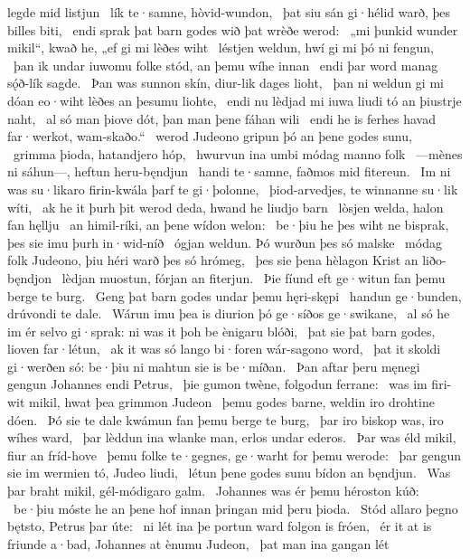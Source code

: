 legde mid listjun \hld\ lík te·samne,
hòvid-wundon, \hld\ þat siu sán gi·hélid warð,
þes billes biti, \hld\ endi sprak þat barn godes
wið þat wrèðe werod: \hld\ „mi þunkid wunder mikil“, kwað he,
„ef gi mi lèðes wiht \hld\ léstjen weldun,
hwí gi mi þó ni fengun, \hld\ þan ik undar iuwomu folke stód,
an þemu wíhe innan \hld\ endi þar word manag
sǫ́ð-lík sagde. \hld\ Þan was sunnon skín,
diur-lik dages lioht, \hld\ þan ni weldun gi mi dóan eo·wiht
lèðes an þesumu liohte, \hld\ endi nu lèdjad mi iuwa liudi tó
an þiustrje naht, \hld\ al só man þiove dót,
þan man þene fáhan wili \hld\ endi he is ferhes havad
far·werkot, wam-skaðo.“ \hld\ werod Judeono
gripun þó an þene godes sunu, \hld\ grimma þioda,
hatandjero hóp, \hld\ hwurvun ina umbi
módag manno folk \hld\ —mènes ni sáhun—,
heftun heru-bęndjun \hld\ handi te·samne,
faðmos mid fitereun. \hld\ Im ni was su·likaro firin-kwála
þarf te gi·þolonne, \hld\ þiod-arvedjes,
te winnanne su·lik wíti, \hld\ ak he it þurh þit werod deda,
hwand he liudjo barn \hld\ lòsjen welda,
halon fan hęllju \hld\ an himil-ríki,
an þene wídon welon: \hld\ be·þiu he þes wiht ne bisprak,
þes sie imu þurh in·wid-níð \hld\ ógjan weldun.
Þó wurðun þes só malske \hld\ módag folk Judeono,
þiu héri warð þes só hrómeg, \hld\ þes sie þena hèlagon Krist
an liðo-bęndjon \hld\ lèdjan muostun,
fórjan an fiterjun. \hld\ Þie fíund eft ge·witun
fan þemu berge te burg. \hld\ Geng þat barn godes
undar þemu hęri-skępi \hld\ handun ge·bunden,
drúvondi te dale. \hld\ Wárun imu þea is diurion þó
ge·síðos ge·swikane, \hld\ al só he im ér selvo gi·sprak:
ni was it þoh be ènigaru blóði, \hld\ þat sie þat barn godes,
lioven far·létun, \hld\ ak it was só lango bi·foren
wár-sagono word, \hld\ þat it skoldi gi·werðen só:
be·þiu ni mahtun sie is be·míðan. \hld\ Þan aftar þeru męnegi gengun
Johannes endi Petrus, \hld\ þie gumon twène,
folgodun ferrane: \hld\ was im firi-wit mikil,
hwat þea grimmon Judeon \hld\ þemu godes barne,
weldin iro drohtine dóen. \hld\ Þó sie te dale kwámun
fan þemu berge te burg, \hld\ þar iro biskop was,
iro wíhes ward, \hld\ þar lèddun ina wlanke man,
erlos undar ederos. \hld\ Þar was éld mikil,
fiur an fríd-hove \hld\ þemu folke te·gegnes,
ge·warht for þemu werode: \hld\ þar gengun sie im wermien tó,
Judeo liudi, \hld\ létun þene godes sunu
bídon an bęndjun. \hld\ Was þar braht mikil,
gél-módigaro galm. \hld\ Johannes was ér
þemu héroston kúð: \hld\ be·þiu móste he an þene hof innan
þringan mid þeru þioda. \hld\ Stód allaro þegno bętsto,
Petrus þar úte: \hld\ ni lét ina þe portun ward
folgon is fróen, \hld\ ér it at is friunde a·bad,
Johannes at ènumu Judeon, \hld\ þat man ina gangan lét
